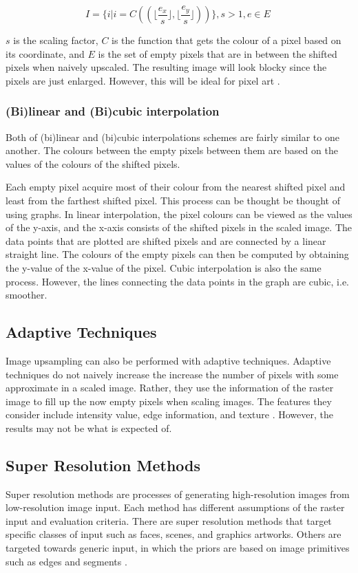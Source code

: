 $$ I = \{i | i = C((\lfloor\frac{e_{x}}{s}\rfloor, \lfloor\frac{e_{y}}{s}\rfloor))\}, s > 1, e \in E\ $$

$s$ is the scaling factor, $C$ is the function that gets the colour of a pixel based on its coordinate, and $E$ is the set of empty pixels that are in between the shifted pixels when naively upscaled. The resulting image will look blocky since the pixels are just enlarged. However, this will be ideal for pixel art \cite{resizingimages}.

\subsubsection{(Bi)linear and (Bi)cubic interpolation}\label{sec:bilinear-bicubic-interpolation}
Both of (bi)linear and (bi)cubic interpolations schemes are fairly similar to one another. The colours between the empty pixels between them are based on the values of the colours of the shifted pixels.

Each empty pixel acquire most of their colour from the nearest shifted pixel and least from the farthest shifted pixel. This process can be thought be thought of using graphs. In linear interpolation, the pixel colours can be viewed as the values of the y-axis, and the x-axis consists of the shifted pixels in the scaled image. The data points that are plotted are shifted pixels and are connected by a linear straight line. The colours of the empty pixels can then be computed by obtaining the y-value of the x-value of the pixel. Cubic interpolation is also the same process. However, the lines connecting the data points in the graph are cubic, i.e. smoother.


\subsection{Adaptive Techniques}
Image upsampling can also be performed with adaptive techniques. Adaptive techniques do not naively increase the increase the number of pixels with some approximate in a scaled image. Rather, they use the information of the raster image to fill up the now empty pixels when scaling images. The features they consider include intensity value, edge information, and texture \cite{interpolationtechniquessurvey}. However, the results may not be what is expected of.

\subsection{Super Resolution Methods}
Super resolution methods are processes of generating high-resolution images from low-resolution image input. Each method has different assumptions of the raster input and evaluation criteria. There are super resolution methods that target specific classes of input such as faces, scenes, and graphics artworks. Others are targeted towards generic input, in which the priors are based on image primitives such as edges and segments \cite{sisrbenchmark}.

